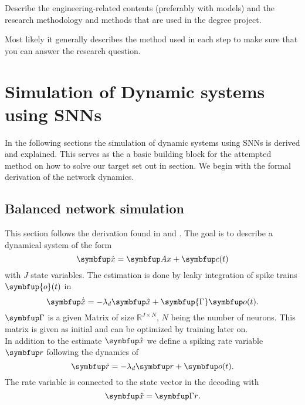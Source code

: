 Describe the engineering-related contents (preferably with models) and the research methodology and methods that are used in the degree project.

Most likely it generally describes the method used in each step to make sure that you can answer the research question.


\section{Simulation of Dynamic systems using \acp{SNN}}\label{sec:simulation}
In the following sections the simulation of dynamic systems using \acp{SNN} is derived and explained. This serves as the a basic building block for the attempted method on how to solve our target set out in section. We begin with the formal derivation of the network dynamics.

\subsection{Balanced network simulation}\label{ssec:balanced_network_sim}

This section follows the derivation found in \cite{boerlin_predictive_2013} and \cite{huang_dynamics_2019}.
The goal is to describe a dynamical system of the form
\begin{equation}\label{eq:x}
\bmu{\dot{x}} = \bmu{Ax} + \bmu{c}(t)
\end{equation}
with $J$ state variables.
The estimation is done by leaky integration of spike trains $\symbfup{o}(t)$ in
\begin{equation}\label{eq:x_hat}
\bmu{\dot{\hat{x}}} = -\lambda_d \bmu{\hat{x}} + \symbfup{\Gamma} \bmu{o}(t).
\end{equation}
$\bmu{\Gamma}$ is a given Matrix of size $\mathbb{R}^{J\times N}$, $N$ being the number of neurons. This matrix is given as initial and can be optimized by training later on\cite{brendel_learning_2020}.\\
In addition to the estimate $\bmu{\hat{x}}$ we define a spiking rate variable $\bmu{r}$ following the dynamics of
\begin{equation}\label{eq:rate}
\bmu{\dot{r}} = -\lambda_d\bmu{r} + \bmu{o}(t).
\end{equation}
The rate variable is connected to the state vector in the decoding with
\begin{equation}\label{eq:decoding}
	\bmu{\hat{x}} = \bmu{\Gamma r}.
\end{equation}

